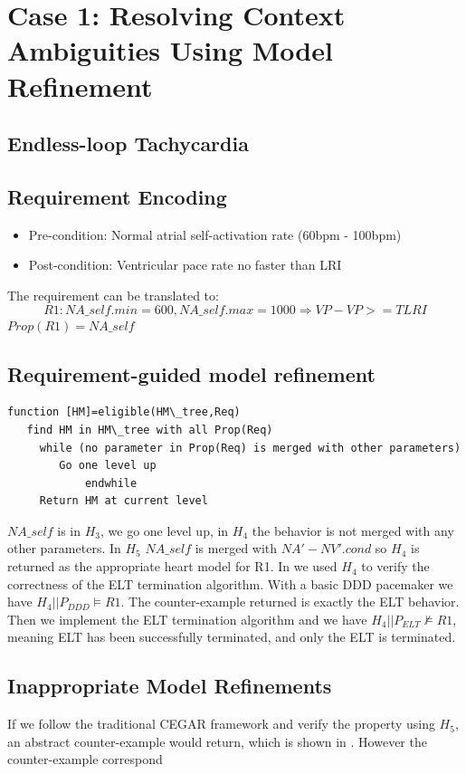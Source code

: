 \section{Case 1: Resolving Context Ambiguities Using Model Refinement}
\label{contextAmbiguities}
\subsection{Endless-loop Tachycardia}
\subsection{Requirement Encoding}
\begin{itemize}
	\item Pre-condition: Normal atrial self-activation rate (60bpm - 100bpm)
    \item Post-condition: Ventricular pace rate no faster than LRI
\end{itemize}
The requirement can be translated to:
$$R1: NA\_self.min=600,NA\_self.max=1000\Rightarrow VP-VP>=TLRI$$
$Prop(R1)=NA\_self$
\subsection{Requirement-guided model refinement}
\begin{Verbatim}
function [HM]=eligible(HM\_tree,Req)
   find HM in HM\_tree with all Prop(Req)
	 while (no parameter in Prop(Req) is merged with other parameters)
	    Go one level up
			endwhile
	 Return HM at current level
\end{Verbatim}
$NA\_self$ is in $H_3$, we go one level up, in $H_4$ the behavior is not merged with any other parameters. In $H_5$ $NA\_self$ is merged with  $NA'-NV'.cond$ so $H_4$ is returned as the appropriate heart model for R1. In \cite{STTT13} we used $H_4$ to verify the correctness of the ELT termination algorithm. With a basic DDD pacemaker we have $H_4 || P_{DDD}\models R1$. The counter-example returned is exactly the ELT behavior. Then we implement the ELT termination algorithm and we have  $H_4 || P_{ELT}\not\models R1$, meaning ELT has been successfully terminated, and only the ELT is terminated. 

\subsection{Inappropriate Model Refinements}
If we follow the traditional CEGAR framework and verify the property using $H_5$, an abstract counter-example would return, which is shown in . However the counter-example correspond
 
